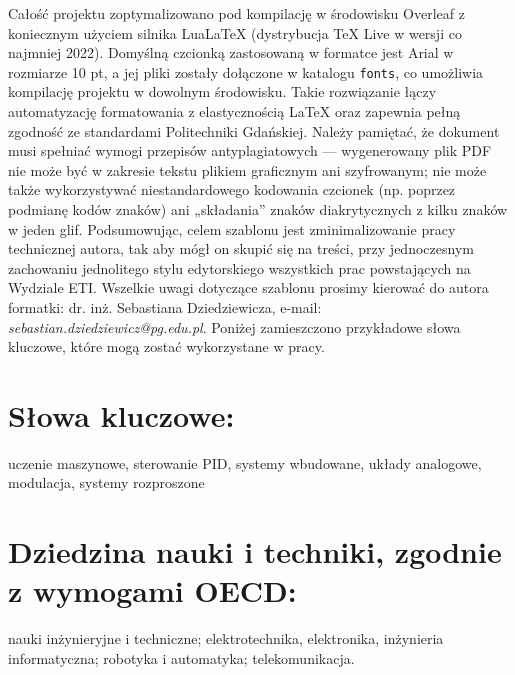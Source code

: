 Całość projektu zoptymalizowano pod kompilację w środowisku Overleaf z koniecznym użyciem silnika LuaLaTeX (dystrybucja TeX Live w wersji co najmniej 2022). Domyślną czcionką zastosowaną w formatce jest Arial w rozmiarze 10 pt, a jej pliki zostały dołączone w katalogu \texttt{fonts}, co umożliwia kompilację projektu w dowolnym środowisku. Takie rozwiązanie łączy automatyzację formatowania z elastycznością \LaTeX{} oraz zapewnia pełną zgodność ze standardami Politechniki Gdańskiej. Należy pamiętać, że dokument musi spełniać wymogi przepisów antyplagiatowych — wygenerowany plik PDF nie może być w zakresie tekstu plikiem graficznym ani szyfrowanym; nie może także wykorzystywać niestandardowego kodowania czcionek (np. poprzez podmianę kodów znaków) ani „składania” znaków diakrytycznych z kilku znaków w jeden glif. Podsumowując, celem szablonu jest zminimalizowanie pracy technicznej autora, tak aby mógł on skupić się na treści, przy jednoczesnym zachowaniu jednolitego stylu edytorskiego wszystkich prac powstających na Wydziale ETI. Wszelkie uwagi dotyczące szablonu prosimy kierować do autora formatki: dr. inż. Sebastiana Dziedziewicza, e-mail: \textit{sebastian.dziedziewicz@pg.edu.pl}. Poniżej zamieszczono przykładowe słowa kluczowe, które mogą zostać wykorzystane w pracy.

\section*{Słowa kluczowe:}
\noindent uczenie maszynowe, sterowanie PID, systemy wbudowane, układy analogowe, modulacja, systemy rozproszone
\section*{Dziedzina nauki i techniki, zgodnie z wymogami OECD:}
\noindent nauki inżynieryjne i techniczne;  elektrotechnika, elektronika, inżynieria informatyczna; robotyka i automatyka; telekomunikacja.
